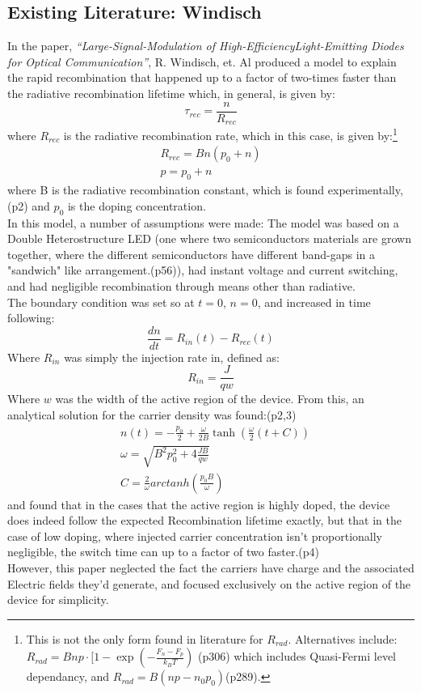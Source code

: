 \documentclass[titlepage]{article}
\begin{document}
\subsection{Existing Literature: Windisch}
In the paper, \textit{“Large-Signal-Modulation of High-EfficiencyLight-Emitting Diodes for Optical Communication”}, R. Windisch, et. Al\cite{Windisch} produced a model to explain the rapid recombination that happened up to a factor of two-times faster than the radiative recombination lifetime which, in general, is given by:
\begin{equation}
\tau_{rec} = \dfrac{n}{R_{rec}}
\end{equation}
where $R_{rec}$ is the radiative recombination rate, which in this case, is given by:\footnote{This is not the only form found in literature for $R_{rad}$. Alternatives include:$R_{rad} = Bnp \cdot \Big[1-\exp(-\frac{F_n-F_p}{k_B T})$ \cite{NSD}(p306) which includes Quasi-Fermi level dependancy, and $R_{rad} = B(np-n_0 p_0)$\cite{NSD}(p289).}
\begin{eqnarray}
R_{rec} = Bn(p_0 + n)\\
p = p_0 + n
\end{eqnarray}
where B is the radiative recombination constant, which is found experimentally,\cite{Windisch}(p2) and $p_0$ is the doping concentration.\\
In this model, a number of assumptions were made: The model was based on a Double Heterostructure LED (one where two semiconductors materials are grown together, where the different semiconductors have different band-gaps in a "sandwich" like arrangement.\cite{Sze}(p56)), had instant voltage and current switching, and had negligible recombination through means other than radiative.\\
The boundary condition was set so at $t = 0$, $n = 0$, and increased in time following:
\begin{equation}
\dfrac{dn}{dt} = R_{in}(t) - R_{rec}(t)
\end{equation}
Where $R_{in}$ was simply the injection rate in, defined as:
\begin{equation}
R_{in} = \frac{J}{qw}
\end{equation}
Where $w$ was the width of the active region of the device. From this, an analytical solution for the carrier density was found:\cite{Windisch}(p2,3)
\begin{eqnarray}
&n(t) = -\frac{p_0}{2} + \frac{\omega}{2B} \tanh(\frac{\omega}{2}(t+C))\\
&\omega = \sqrt{B^2p_0^2+4\frac{JB}{qw}}\\
&C = \frac{2}{\omega} arctanh(\frac{p_0 B}{\omega})
\end{eqnarray}
and found that in the cases that the active region is highly doped, the device does indeed follow the expected Recombination lifetime exactly, but that in the case of low doping, where injected carrier concentration isn't proportionally negligible, the switch time can up to a factor of two faster.\cite{Windisch}(p4)\\
However, this paper neglected the fact the carriers have charge and the associated Electric fields they'd generate, and focused exclusively on the active region of the device for simplicity.
\end{document}
